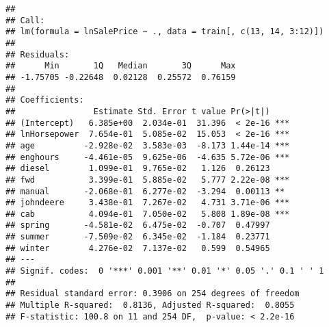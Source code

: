 \documentclass[
]{article}
\newenvironment{Shaded}{\begin{snugshade}}{\end{snugshade}}
\newcommand{\AttributeTok}[1]{\textcolor[rgb]{0.13,0.29,0.53}{#1}}
\newcommand{\CommentTok}[1]{\textcolor[rgb]{0.56,0.35,0.01}{\textit{#1}}}
\newcommand{\DecValTok}[1]{\textcolor[rgb]{0.00,0.00,0.81}{#1}}
\newcommand{\FunctionTok}[1]{\textcolor[rgb]{0.13,0.29,0.53}{\textbf{#1}}}
\newcommand{\NormalTok}[1]{#1}
\newcommand{\SpecialCharTok}[1]{\textcolor[rgb]{0.81,0.36,0.00}{\textbf{#1}}}
\newcommand{\StringTok}[1]{\textcolor[rgb]{0.31,0.60,0.02}{#1}}
\begin{document}
\begin{verbatim}
## 
## Call:
## lm(formula = lnSalePrice ~ ., data = train[, c(13, 14, 3:12)])
## 
## Residuals:
##      Min       1Q   Median       3Q      Max 
## -1.75705 -0.22648  0.02128  0.25572  0.76159 
## 
## Coefficients:
##                Estimate Std. Error t value Pr(>|t|)    
## (Intercept)   6.385e+00  2.034e-01  31.396  < 2e-16 ***
## lnHorsepower  7.654e-01  5.085e-02  15.053  < 2e-16 ***
## age          -2.928e-02  3.583e-03  -8.173 1.44e-14 ***
## enghours     -4.461e-05  9.625e-06  -4.635 5.72e-06 ***
## diesel        1.099e-01  9.765e-02   1.126  0.26123    
## fwd           3.399e-01  5.885e-02   5.777 2.22e-08 ***
## manual       -2.068e-01  6.277e-02  -3.294  0.00113 ** 
## johndeere     3.438e-01  7.267e-02   4.731 3.71e-06 ***
## cab           4.094e-01  7.050e-02   5.808 1.89e-08 ***
## spring       -4.581e-02  6.475e-02  -0.707  0.47997    
## summer       -7.509e-02  6.345e-02  -1.184  0.23771    
## winter        4.276e-02  7.137e-02   0.599  0.54965    
## ---
## Signif. codes:  0 '***' 0.001 '**' 0.01 '*' 0.05 '.' 0.1 ' ' 1
## 
## Residual standard error: 0.3906 on 254 degrees of freedom
## Multiple R-squared:  0.8136, Adjusted R-squared:  0.8055 
## F-statistic: 100.8 on 11 and 254 DF,  p-value: < 2.2e-16
\end{verbatim}

\begin{Shaded}
\end{Shaded}
\end{document}
